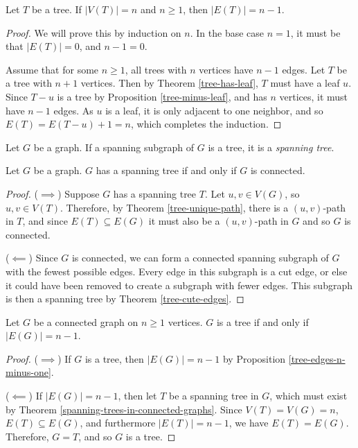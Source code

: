 \documentclass[12pt]{article}
\begin{document}
\begin{prop}\label{tree-edges-n-minus-one}
    Let $T$ be a tree. If $|V(T)| = n$ and $n \geq 1$, then $|E(T)| = n-1$.
\end{prop}

\begin{proof}
    We will prove this by induction on $n$. In the base case $n=1$, it must be that $|E(T)| = 0$, and $n-1 = 0$.

    Assume that for some $n \geq 1$, all trees with $n$ vertices have $n-1$ edges. Let $T$ be a tree with $n+1$ vertices. Then by Theorem \ref{tree-has-leaf}, $T$ must have a leaf $u$. Since $T - u$ is a tree by Proposition \ref{tree-minus-leaf}, and has $n$ vertices, it must have $n-1$ edges. As $u$ is a leaf, it is only adjacent to one neighbor, and so $E(T) = E(T - u) + 1 = n$, which completes the induction.
\end{proof}

\begin{defn}
    Let $G$ be a graph. If a spanning subgraph of $G$ is a tree, it is a \emph{spanning tree}.
\end{defn}

\begin{thm}\label{spanning-trees-in-connected-graphs}
    Let $G$ be a graph. $G$ has a spanning tree if and only if $G$ is connected.
\end{thm}

\begin{proof}\proofbreak
    ($\implies$) Suppose $G$ has a spanning tree $T$. Let $u, v \in V(G)$, so $u, v \in V(T)$. Therefore, by Theorem \ref{tree-unique-path}, there is a $(u,v)$-path in $T$, and since $E(T) \subseteq E(G)$ it must also be a $(u,v)$-path in $G$ and so $G$ is connected.

    ($\impliedby$) Since $G$ is connected, we can form a connected spanning subgraph of $G$ with the fewest possible edges. Every edge in this subgraph is a cut edge, or else it could have been removed to create a subgraph with fewer edges. This subgraph is then a spanning tree by Theorem \ref{tree-cute-edges}.
\end{proof}

\begin{thm}\label{tree-edges-iff}
    Let $G$ be a connected graph on $n \geq 1$ vertices. $G$ is a tree if and only if $|E(G)| = n-1$.
\end{thm}

\begin{proof}\proofbreak
    ($\implies$) If $G$ is a tree, then $|E(G)| = n-1$ by Proposition \ref{tree-edges-n-minus-one}.

    ($\impliedby$) If $|E(G)| = n-1$, then let $T$ be a spanning tree in $G$, which must exist by Theorem \ref{spanning-trees-in-connected-graphs}. Since $V(T) = V(G) = n$, $E(T) \subseteq E(G)$, and furthermore $|E(T)| = n-1$, we have $E(T) = E(G)$. Therefore, $G = T$, and so $G$ is a tree.
\end{proof}
\end{document}
